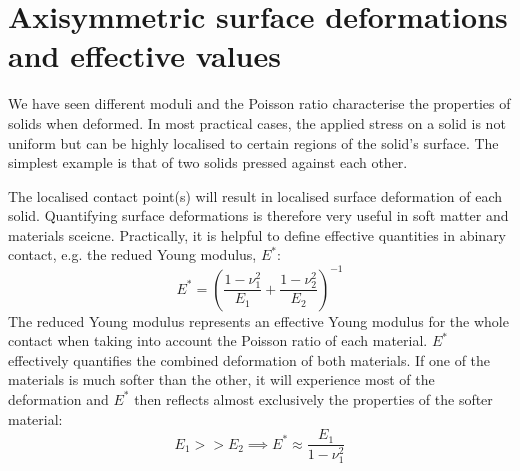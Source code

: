 \documentclass[a4paper, 11pt, normalem]{report}
\begin{document}
\section{Axisymmetric surface deformations and effective values}
We have seen different moduli and the Poisson ratio characterise the properties of solids when deformed.
In most practical cases, the applied stress on a solid is not uniform but can be highly localised to certain regions of the solid's surface.
The simplest example is that of two solids pressed against each other.
\begin{figure}[H]
    \centering
\end{figure}
The localised contact point(s) will result in localised surface deformation of each solid.
Quantifying surface deformations is therefore very useful in soft matter and materials sceicne.
Practically, it is helpful to define effective quantities in abinary contact, e.g. the redued Young modulus, $E^*$:
\begin{equation}
    E^* = \left(\frac{1-\nu_1^2}{E_1} + \frac{1-\nu_2^2}{E_2}\right)^{-1}
\end{equation}
The reduced Young modulus represents an effective Young modulus for the whole contact when taking into account the Poisson ratio of each material.
$E^*$ effectively quantifies the combined deformation of both materials.
If one of the materials is much softer than the other, it will experience most of the deformation and $E^*$ then reflects almost exclusively the properties of the softer material:
\begin{equation}
    E_1 >> E_2 \implies E^* \approx \frac{E_1}{1-\nu_1^2}
\end{equation}
\end{document}
